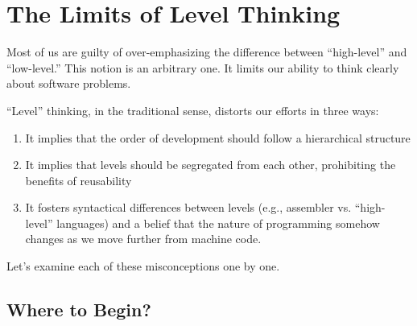 \section{The Limits of Level Thinking}%

Most of us are guilty of over-emphasizing the difference between
``high-level'' and ``low-level.'' This notion is an arbitrary one. It
limits our ability to think clearly about software problems.

``Level'' thinking, in the traditional sense, distorts our efforts in
three ways:

\begin{enumerate}
\item It implies that the order of development should follow a
hierarchical structure

\item It implies that levels should be segregated from each
other, prohibiting the benefits of reusability

\item It fosters syntactical differences between levels (e.g.,
assembler vs. ``high-level'' languages) and a belief that the
nature of programming somehow changes as we move further from
machine code.
\end{enumerate}
Let's examine each of these misconceptions one by one.

\subsection{Where to Begin?}

